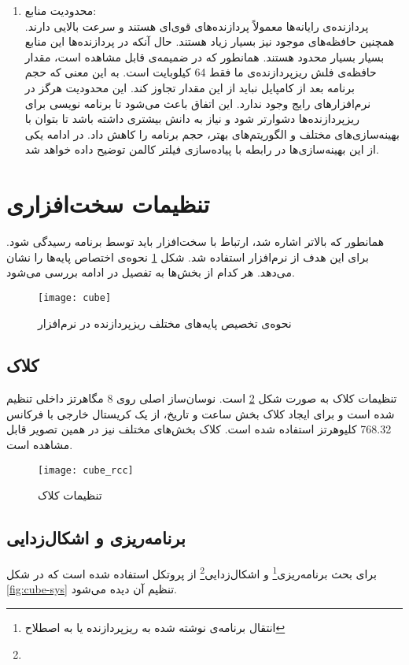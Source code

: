 \begin{enumerate}
	\item محدودیت منابع: \\
	پردازنده‌ی رایانه‌ها معمولاً پردازنده‌های قوی‌ای هستند و سرعت بالایی دارند. همچنین حافظه‌های موجود نیز بسیار زیاد هستند. حال آنکه در پردازنده‌ها این منابع بسیار بسیار محدود هستند. همانطور که در ضمیمه‌ی  قابل مشاهده است، مقدار حافظه‌ی فلش ریزپردازنده‌ی ما فقط 64 کیلوبایت است. به این معنی که حجم برنامه بعد از کامپایل نباید از این مقدار تجاوز کند. این محدودیت هرگز در نرم‌افزارهای رایج وجود ندارد. این اتفاق باعث می‌شود تا برنامه نویسی برای ریزپردازنده‌ها دشوارتر شود و نیاز به دانش بیشتری داشته باشد تا بتوان با بهینه‌سازی‌های مختلف و الگوریتم‌های بهتر، حجم برنامه را کاهش داد. در ادامه یکی از این بهینه‌سازی‌ها در رابطه با پیاده‌سازی فیلتر کالمن توضیح داده خواهد شد.
\end{enumerate}

\section{تنظیمات سخت‌افزاری}
همانطور که بالاتر اشاره شد، ارتباط با سخت‌افزار باید توسط برنامه رسیدگی شود. برای این هدف از نرم‌افزار  استفاده شد. شکل \ref{fig:cube-main} نحوه‌ی اختصاص پایه‌ها را نشان می‌دهد. هر کدام از بخش‌ها به تفصیل در ادامه بررسی می‌شود.

	\begin{figure}[h]
		\centering
		\texttt{[image: cube]}
		\caption{نحوه‌ی تخصیص پایه‌های مختلف ریزپردازنده در نرم‌افزار }
		\label{fig:cube-main}
	\end{figure}

\subsection{کلاک}
تنظیمات کلاک به صورت شکل \ref{fig:cube-rcc} است. نوسان‌ساز اصلی روی 8 مگاهرتز داخلی تنظیم شده است و برای ایجاد کلاک بخش ساعت و تاریخ، از یک کریستال خارجی با فرکانس 768.32 کلیوهرتز استفاده شده است. کلاک بخش‌های مختلف نیز در همین تصویر قابل مشاهده است.

	\begin{figure}[h]
		\centering
		\texttt{[image: cube\_rcc]}
		\caption{تنظیمات کلاک}
		\label{fig:cube-rcc}
	\end{figure}

\subsection{برنامه‌ریزی و اشکال‌زدایی}
برای بحث برنامه‌ریزی\footnote{انتقال برنامه‌ی نوشته شده به ریزپردازنده یا به اصطلاح } و اشکال‌زدایی\footnote{} از پروتکل  استفاده شده است که در شکل \ref{fig:cube-sys} تنظیم آن دیده می‌شود.

